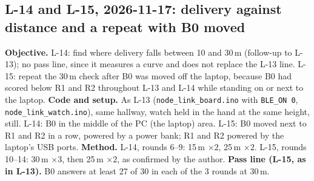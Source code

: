 \IfFileExists{IEEEtran.cls}{\documentclass[conference]{IEEEtran}}{\documentclass[10pt,twocolumn]{article}}
\begin{document}
\subsection*{L-14 and L-15, 2026-11-17: delivery against distance and a repeat with B0 moved}
\textbf{Objective.} L-14: find where delivery falls between 10 and 30\,m (follow-up to L-13); no pass line, since it measures a curve and does not replace the L-13 line. L-15: repeat the 30\,m check after B0 was moved off the laptop, because B0 had scored below R1 and R2 throughout L-13 and L-14 while standing on or next to the laptop. \textbf{Code and setup.} As L-13 (\texttt{node\_link\_board.ino} with \texttt{BLE\_ON 0}, \texttt{node\_link\_watch.ino}), same hallway, watch held in the hand at the same height, still. L-14: B0 in the middle of the PC (the laptop) area. L-15: B0 moved next to R1 and R2 in a row, powered by a power bank; R1 and R2 powered by the laptop's USB ports. \textbf{Method.} L-14, rounds 6--9: 15\,m $\times 2$, 25\,m $\times 2$. L-15, rounds 10--14: 30\,m $\times 3$, then 25\,m $\times 2$, as confirmed by the author. \textbf{Pass line (L-15, as in L-13).} B0 answers at least 27 of 30 in each of the 3 rounds at 30\,m.
\end{document}
